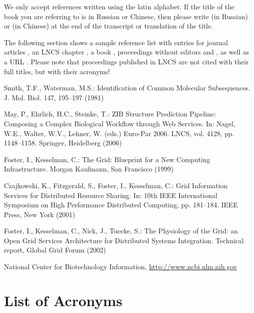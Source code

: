 \documentclass[runningheads,a4paper]{llncs}
\begin{document}
We only accept references written using the latin alphabet. If the title
of the book you are referring to is in Russian or Chinese, then please write
(in Russian) or (in Chinese) at the end of the transcript or translation
of the title.

The following section shows a sample reference list with entries for
journal articles \cite{jour}, an LNCS chapter \cite{lncschap}, a book
\cite{book}, proceedings without editors \cite{proceeding1} and
\cite{proceeding2}, as well as a URL \cite{url}.
Please note that proceedings published in LNCS are not cited with their
full titles, but with their acronyms!

\begin{thebibliography}{4}

 Smith, T.F., Waterman, M.S.: Identification of Common Molecular
Subsequences. J. Mol. Biol. 147, 195--197 (1981)

 May, P., Ehrlich, H.C., Steinke, T.: ZIB Structure Prediction Pipeline:
Composing a Complex Biological Workflow through Web Services. In: Nagel,
W.E., Walter, W.V., Lehner, W. (eds.) Euro-Par 2006. LNCS, vol. 4128,
pp. 1148--1158. Springer, Heidelberg (2006)

 Foster, I., Kesselman, C.: The Grid: Blueprint for a New Computing
Infrastructure. Morgan Kaufmann, San Francisco (1999)

 Czajkowski, K., Fitzgerald, S., Foster, I., Kesselman, C.: Grid
Information Services for Distributed Resource Sharing. In: 10th IEEE
International Symposium on High Performance Distributed Computing, pp.
181--184. IEEE Press, New York (2001)

 Foster, I., Kesselman, C., Nick, J., Tuecke, S.: The Physiology of the
Grid: an Open Grid Services Architecture for Distributed Systems
Integration. Technical report, Global Grid Forum (2002)

 National Center for Biotechnology Information, \url{http://www.ncbi.nlm.nih.gov}

\end{thebibliography}

\section*{List of Acronyms}
\begin{acronym}
\end{acronym}
\end{document}
